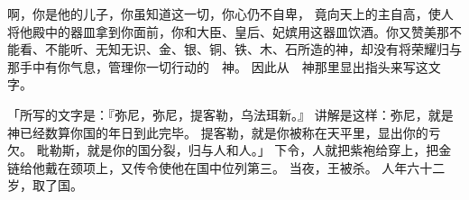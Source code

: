 {啊，你是他的儿子，你虽知道这一切，你心仍不自卑，
竟向天上的主自高，使人将他殿中的器皿拿到你面前，你和大臣、皇后、妃嫔用这器皿饮酒。你又赞美那不能看、不能听、无知无识、金、银、铜、铁、木、石所造的神，却没有将荣耀归与那手中有你气息，管理你一切行动的　神。
因此从　神那里显出指头来写这文字。
\par }{\PP {}「所写的文字是：『弥尼，弥尼，提客勒，乌法珥新。』
讲解是这样：弥尼，就是　神已经数算你国的年日到此完毕。
提客勒，就是你被称在天平里，显出你的亏欠。
毗勒斯，就是你的国分裂，归与{}人和{}人。」
下令，人就把紫袍给{}穿上，把金链给他戴在颈项上，又传令使他在国中位列第三。
当夜，{}王{}被杀。
人{}年六十二岁，取了{}国。

}

